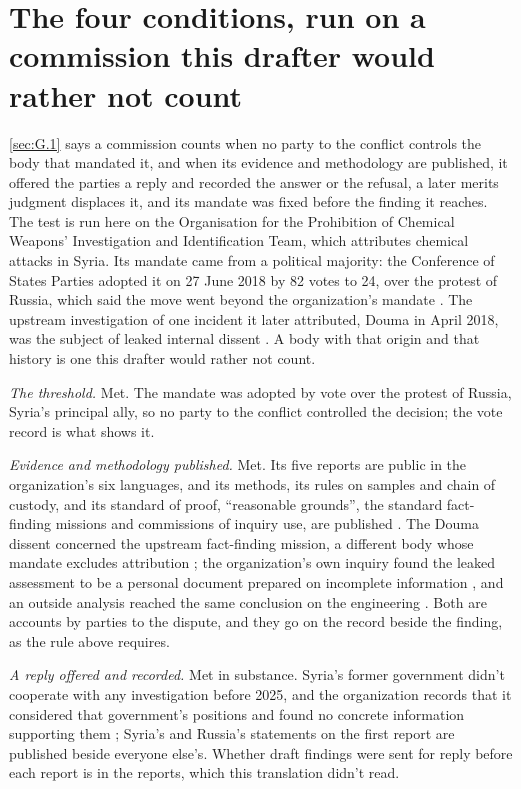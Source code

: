 \section{The four conditions, run on a commission this drafter would rather not count}
\label{sec:G.2}
\ref{sec:G.1} says a commission counts when no party to the conflict controls the body that mandated it, and when its evidence and methodology are published, it offered the parties a reply and recorded the answer or the refusal, a later merits judgment displaces it, and its mandate was fixed before the finding it reaches. The test is run here on the Organisation for the Prohibition of Chemical Weapons' Investigation and Identification Team, which attributes chemical attacks in Syria. Its mandate came from a political majority: the Conference of States Parties adopted it on 27 June 2018 by 82 votes to 24, over the protest of Russia, which said the move went beyond the organization's mandate \autocite{opcw2018attribution,bbc2018opcwblame}. The upstream investigation of one incident it later attributed, Douma in April 2018, was the subject of leaked internal dissent \autocite{democracynow2019douma,opcw2020breaches}. A body with that origin and that history is one this drafter would rather not count.

\emph{The threshold.} Met. The mandate was adopted by vote over the protest of Russia, Syria's principal ally, so no party to the conflict controlled the decision; the vote record is what shows it.

\emph{Evidence and methodology published.} Met. Its five reports are public in the organization's six languages, and its methods, its rules on samples and chain of custody, and its standard of proof, “reasonable grounds”, the standard fact-finding missions and commissions of inquiry use, are published \autocite{opcw2026iitpage}. The Douma dissent concerned the upstream fact-finding mission, a different body whose mandate excludes attribution \autocite{opcwffm}; the organization's own inquiry found the leaked assessment to be a personal document prepared on incomplete information \autocite{opcw2020breaches}, and an outside analysis reached the same conclusion on the engineering \autocite{bellingcat2020henderson}. Both are accounts by parties to the dispute, and they go on the record beside the finding, as the rule above requires.

\emph{A reply offered and recorded.} Met in substance. Syria's former government didn't cooperate with any investigation before 2025, and the organization records that it considered that government's positions and found no concrete information supporting them \autocite{opcw2026iitkafrzeita}; Syria's and Russia's statements on the first report are published beside everyone else's. Whether draft findings were sent for reply before each report is in the reports, which this translation didn't read.


